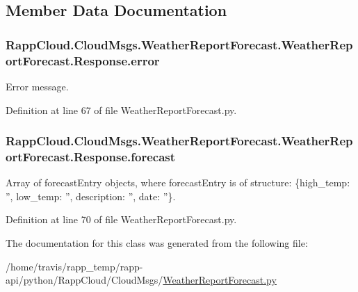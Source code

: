 \subsection{Member Data Documentation}
\hypertarget{classRappCloud_1_1CloudMsgs_1_1WeatherReportForecast_1_1WeatherReportForecast_1_1Response_a2fb190f0c571acb9c4f476a4b38e9510}{
\subsubsection[{error}]{\setlength{\rightskip}{0pt plus 5cm}Rapp\-Cloud.\-Cloud\-Msgs.\-Weather\-Report\-Forecast.\-Weather\-Report\-Forecast.\-Response.\-error}}\label{classRappCloud_1_1CloudMsgs_1_1WeatherReportForecast_1_1WeatherReportForecast_1_1Response_a2fb190f0c571acb9c4f476a4b38e9510}


Error message. 



Definition at line 67 of file Weather\-Report\-Forecast.\-py.

\hypertarget{classRappCloud_1_1CloudMsgs_1_1WeatherReportForecast_1_1WeatherReportForecast_1_1Response_a1ed6be7665ffe0bfefa11be6d62ff789}{
\subsubsection[{forecast}]{\setlength{\rightskip}{0pt plus 5cm}Rapp\-Cloud.\-Cloud\-Msgs.\-Weather\-Report\-Forecast.\-Weather\-Report\-Forecast.\-Response.\-forecast}}\label{classRappCloud_1_1CloudMsgs_1_1WeatherReportForecast_1_1WeatherReportForecast_1_1Response_a1ed6be7665ffe0bfefa11be6d62ff789}


Array of forecast\-Entry objects, where forecast\-Entry is of structure\-: \{high\-\_\-temp\-: '', low\-\_\-temp\-: '', description\-: '', date\-: ''\}. 



Definition at line 70 of file Weather\-Report\-Forecast.\-py.



The documentation for this class was generated from the following file\-:\begin{DoxyCompactItemize}
\item 
/home/travis/rapp\-\_\-temp/rapp-\/api/python/\-Rapp\-Cloud/\-Cloud\-Msgs/\hyperlink{WeatherReportForecast_8py}{Weather\-Report\-Forecast.\-py}\end{DoxyCompactItemize}
